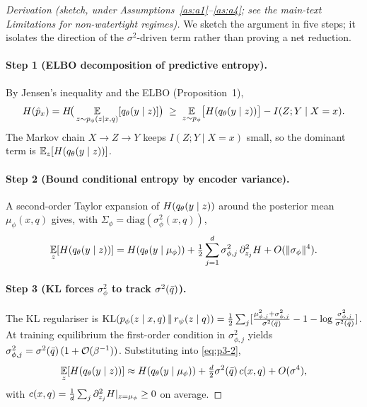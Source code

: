 \begin{proof}[Derivation (sketch, under Assumptions~\ref{as:a1}--\ref{as:a4}; see the
main-text Limitations for non-watertight regimes)]
We sketch the argument in five steps; it isolates the direction of the
$\sigma^2$-driven term rather than proving a net reduction.

\paragraph{Step 1 (ELBO decomposition of predictive entropy).}
By Jensen's inequality and the \qvib{} ELBO (Proposition~1),
\begin{equation}
H(\hat{p}_x) = H\!\big(\operatorname*{\mathbb{E}}_{z\sim p_\phi(z\mid x,q)}[q_\theta(y\mid z)]\big)
\;\geq\; \operatorname*{\mathbb{E}}_{z\sim p_\phi}\!\big[H(q_\theta(y\mid z))\big] - I(Z;Y\mid X=x).
\label{eq:p3-1}
\end{equation}
The Markov chain $X\to Z\to Y$ keeps $I(Z;Y\mid X=x)$ small, so the dominant term is
$\operatorname*{\mathbb{E}}_z[H(q_\theta(y\mid z))]$.

\paragraph{Step 2 (Bound conditional entropy by encoder variance).}
A second-order Taylor expansion of $H(q_\theta(y\mid z))$ around the posterior mean
$\mu_\phi(x,q)$ gives, with $\Sigma_\phi=\mathrm{diag}(\sigma_\phi^2(x,q))$,
\begin{equation}
\operatorname*{\mathbb{E}}_z[H(q_\theta(y\mid z))] = H(q_\theta(y\mid\mu_\phi))
+ \tfrac{1}{2}\sum_{j=1}^{d}\sigma_{\phi,j}^2\,\partial^2_{z_j}H + O(\|\sigma_\phi\|^4).
\label{eq:p3-2}
\end{equation}

\paragraph{Step 3 (KL forces $\sigma_\phi^2$ to track $\sigma^2(\bar{q})$).}
The \qvib{} KL regulariser is
$\operatorname{KL}(p_\phi(z\mid x,q)\,\|\,r_\psi(z\mid q))
= \tfrac{1}{2}\sum_j[\tfrac{\mu_{\phi,j}^2+\sigma_{\phi,j}^2}{\sigma^2(\bar{q})}
- 1 - \log\tfrac{\sigma_{\phi,j}^2}{\sigma^2(\bar{q})}]$.
At training equilibrium the first-order condition in $\sigma_{\phi,j}^2$ yields
$\sigma_{\phi,j}^2 = \sigma^2(\bar{q})\,(1+\mathcal{O}(\beta^{-1}))$. Substituting into
\eqref{eq:p3-2},
\begin{equation}
\operatorname*{\mathbb{E}}_z[H(q_\theta(y\mid z))] \approx H(q_\theta(y\mid\mu_\phi))
+ \tfrac{d}{2}\sigma^2(\bar{q})\,c(x,q) + O(\sigma^4),
\label{eq:p3-3}
\end{equation}
with $c(x,q)=\tfrac{1}{d}\sum_j\partial^2_{z_j}H|_{z=\mu_\phi}\geq 0$ on average.


\end{proof}
